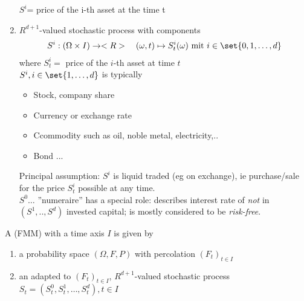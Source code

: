 \begin{enumerate}
	\newline $S^i$= price of the i-th asset at the time t
	\item {} $R^{d+1}$-valued  stochastic process with components
	\begin{align*}
		S^i: (\Omega \times I) \to \R\quad (\omega,t) \mapsto S^i_t(\omega) \mit i \in \set{0,1,\dots,d}
	\end{align*} 
	where $S^i_t=$ price of the $i$-th asset at time $t$\\
	$S^i, i \in \set{1,\dots,d}$ is typically
	\begin{itemize}
		\item Stock, company share
		\item Currency or exchange rate
		\item Ccommodity such as oil, noble metal, electricity,..
		\item Bond ... 
	\end{itemize}
	Principal assumption: $S^i$ is liquid traded (eg on exchange), ie purchase/sale for the price $S_t^i$ possible at any time.\\
	
	$S^0\dots$ ''numeraire'' has a special role: describes interest rate of \emph{not} in $(S^1,..,S^d)$ invested capital; is mostly considered to be \emph{risk-free}.
\end{enumerate}

\begin{definition}
	A  (FMM) with a time axis $I$ is given by
	\begin{enumerate}
		\item a probability space $(\Omega, F,P)$ with percolation $(F_t)_{t\in I}$
		\item an adapted to $(F_t)_{t \in I}$, $R^{d+1}$-valued stochastic process $S_t = (S^0_t, S_t^1, \dots, S^d_t),t \in I$
	\end{enumerate} 
\end{definition}

